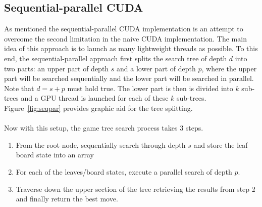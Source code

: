 \subsection{Sequential-parallel CUDA}
As mentioned the sequential-parallel CUDA implementation is an attempt to overcome the second limitation in the naive CUDA implementation. The main idea of this approach is to launch as many lightweight threads as possible. To this end, the sequential-parallel approach first splits the search tree of depth $d$ into two parts:
an upper part of depth $s$ and a lower part of depth $p$, where the upper part will be searched sequentially and the lower part will be searched in parallel. Note that $d=s+p$ must hold true. The lower part is then is divided into $k$ sub-trees and a GPU thread is launched for each of these $k$ sub-trees. Figure~\ref{fig:seqpar} provides graphic aid for the tree splitting.\\
\\
Now with this setup, the game tree search process takes 3 steps. \cite{Rocki}
\begin{enumerate}
    \item From the root node, sequentially search through depth $s$ and store the leaf board state into an array 
    \item For each of the leaves/board states, execute a parallel search of depth $p$.
    \item Traverse down the upper section of the tree retrieving the results from step 2 and finally return the best move.
\end{enumerate}

